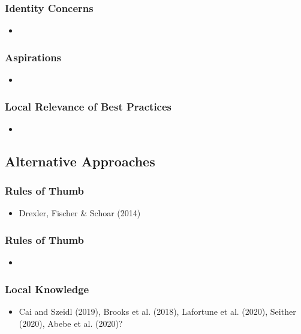 \documentclass[hideothersubsections, usenames,dvipsnames,10pt]{beamer}
\begin{document}
\begin{frame}
\frametitle{Identity Concerns}
	\begin{itemize}
	\item 
	\vspace{0.1in}
	\end{itemize}
\end{frame}

\begin{frame}
\frametitle{Aspirations}
	\begin{itemize}
	\item 
	\vspace{0.1in}
	\end{itemize}
\end{frame}

\begin{frame}
\frametitle{Local Relevance of Best Practices}
	\begin{itemize}
	\item 
	\vspace{0.1in}
	\end{itemize}
\end{frame}


\subsection{Alternative Approaches}

\begin{frame}
\frametitle{Rules of Thumb}
	\begin{itemize}
	\item Drexler, Fischer \& Schoar (2014)
	\vspace{0.1in}
	\end{itemize}
\end{frame}

\begin{frame}
\frametitle{Rules of Thumb}
	\begin{itemize}
	\item 
	\vspace{0.1in}
	\end{itemize}
\end{frame}


\begin{frame}
\frametitle{Local Knowledge}
	\begin{itemize}
	\item Cai and Szeidl (2019), Brooks et al. (2018), Lafortune et al. (2020), Seither (2020), Abebe et al. (2020)?
	\vspace{0.1in}
	\end{itemize}
\end{frame}
\end{document}
